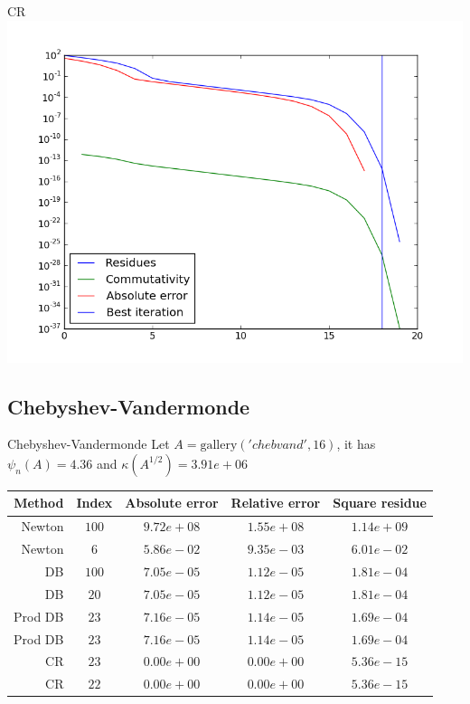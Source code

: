 \documentclass{beamer}
\theoremstyle{plain}
\theoremstyle{definition}
\theoremstyle{remark}
\begin{document}
\begin{frame}{CR}
  \includegraphics[width=\textwidth,height=\textheight]{"moler/CR - absplot"}
\end{frame}


\subsection{Chebyshev-Vandermonde}

\begin{frame}{Chebyshev-Vandermonde}
  Let $A = \mathrm{gallery}('chebvand',16)$, it has $\psi_n(A) = 4.36$
  and $\kappa(A^{1/2}) = 3.91e+06$

  \begin{tabular}{r| c c c c}
    Method & Index & Absolute error & Relative error & Square residue \\
    \hline
    Newton & $100$ & $9.72e+08$ & $1.55e+08$ & $1.14e+09$ \\
    Newton & $6$ & $5.86e-02$ & $9.35e-03$ & $6.01e-02$ \\
    \hline
    DB & $100$ & $7.05e-05$ & $1.12e-05$ & $1.81e-04$ \\
    DB & $20$ & $7.05e-05$ & $1.12e-05$ & $1.81e-04$ \\
    \hline
    Prod DB & $23$ & $7.16e-05$ & $1.14e-05$ & $1.69e-04$ \\
    Prod DB & $23$ & $7.16e-05$ & $1.14e-05$ & $1.69e-04$ \\
    \hline
    CR & $23$ & $0.00e+00$ & $0.00e+00$ & $5.36e-15$ \\
    CR & $22$ & $0.00e+00$ & $0.00e+00$ & $5.36e-15$ \\
\end{tabular}
\end{frame}
\end{document}
